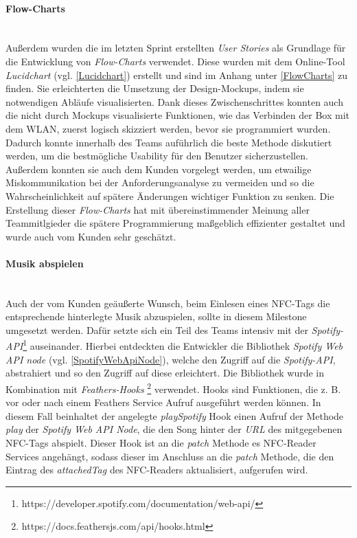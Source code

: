 \documentclass[10pt, a4paper]{article}
\begin{document}
\begin{onehalfspace}
\paragraph*{Flow-Charts} $~$ \\
Außerdem wurden die im letzten Sprint erstellten \textit{User Stories} als Grundlage für die Entwicklung von \textit{Flow-Charts} verwendet.
Diese wurden mit dem Online-Tool \textit{Lucidchart} (vgl. \ref*{Lucidchart}) erstellt und sind im Anhang unter \ref*{FlowCharts} zu finden.
Sie erleichterten die Umsetzung der Design-Mockups, indem sie notwendigen Abläufe visualisierten.
Dank dieses Zwischenschrittes konnten auch die nicht durch Mockups visualisierte Funktionen, wie das Verbinden der Box mit dem WLAN, zuerst logisch skizziert
werden, bevor sie programmiert wurden. Dadurch konnte innerhalb des Teams auführlich die beste Methode diskutiert werden, um die bestmögliche Usability
für den Benutzer sicherzustellen. Außerdem konnten sie auch dem Kunden vorgelegt werden, um etwailige Miskommunikation bei der Anforderungsanalyse zu vermeiden
und so die Wahrscheinlichkeit auf spätere Änderungen wichtiger Funktion zu senken. Die Erstellung dieser \textit{Flow-Charts} hat mit übereinstimmender
Meinung aller Teammitlgieder die spätere Programmierung maßgeblich effizienter gestaltet und wurde auch vom Kunden sehr geschätzt.


\paragraph*{Musik abspielen} $~$ \\
Auch der vom Kunden geäußerte Wunsch, beim Einlesen eines NFC-Tags die entsprechende hinterlegte Musik abzuspielen, sollte in diesem Milestone umgesetzt werden.
Dafür setzte sich ein Teil des Teams intensiv mit der \textit{Spotify-API}\footnote{https://developer.spotify.com/documentation/web-api/} auseinander.
Hierbei entdeckten die Entwickler die Bibliothek \textit{Spotify Web API node} (vgl. \ref*{SpotifyWebApiNode}), welche den Zugriff auf die \textit{Spotify-API},
abstrahiert und so den Zugriff auf diese erleichtert. Die Bibliothek wurde in Kombination mit \textit{Feathers-Hooks}
\footnote{https://docs.feathersjs.com/api/hooks.html} verwendet. Hooks sind Funktionen, die z. B. vor oder nach einem Feathers Service Aufruf ausgeführt werden
können. In diesem Fall beinhaltet der angelegte \textit{playSpotify} Hook einen Aufruf der Methode \textit{play} der \textit{Spotify Web API Node}, die den Song
hinter der \textit{URL} des mitgegebenen NFC-Tags abspielt. Dieser Hook ist an die \textit{patch} Methode es NFC-Reader Services angehängt, sodass dieser im
Anschluss an die \textit{patch} Methode, die den Eintrag des \textit{attachedTag} des NFC-Readers aktualisiert, aufgerufen wird.


\end{onehalfspace}
\end{document}
